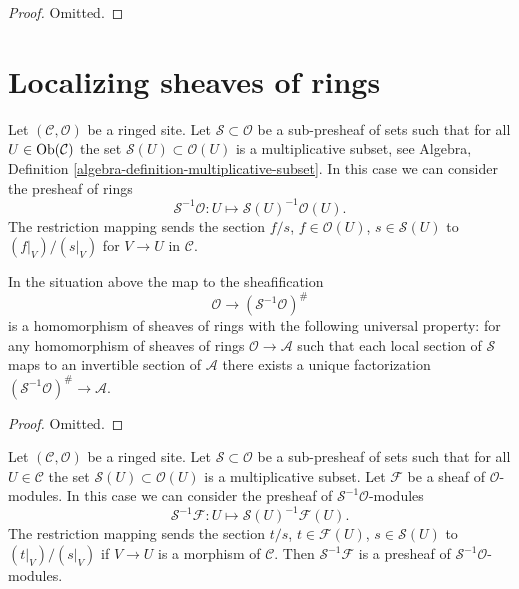 \begin{proof}
Omitted.
\end{proof}











\section{Localizing sheaves of rings}
\label{section-localizing-sheaves-rings}

\noindent
Let $(\mathcal{C}, \mathcal{O})$ be a ringed site.
Let $\mathcal{S} \subset \mathcal{O}$ be a sub-presheaf of sets
such that for all $U \in \mathop{\mathrm{Ob}}\nolimits(\mathcal{C})$ the set
$\mathcal{S}(U) \subset \mathcal{O}(U)$ is a multiplicative subset, see
Algebra, Definition \ref{algebra-definition-multiplicative-subset}.
In this case we can consider the presheaf of rings
$$
\mathcal{S}^{-1}\mathcal{O} :
U \longmapsto \mathcal{S}(U)^{-1}\mathcal{O}(U).
$$
The restriction mapping sends the section
$f/s$, $f \in \mathcal{O}(U)$, $s \in \mathcal{S}(U)$
to $(f|_V)/(s|_V)$ for $V \to U$ in $\mathcal{C}$.

\begin{lemma}
\label{lemma-simple-invert}
In the situation above the map to the sheafification
$$
\mathcal{O} \longrightarrow (\mathcal{S}^{-1}\mathcal{O})^\#
$$
is a homomorphism of sheaves of rings with the following
universal property: for any homomorphism of sheaves of rings
$\mathcal{O} \to \mathcal{A}$ such that each local section
of $\mathcal{S}$ maps to an invertible section of $\mathcal{A}$
there exists a unique factorization
$(\mathcal{S}^{-1}\mathcal{O})^\# \to \mathcal{A}$.
\end{lemma}

\begin{proof}
Omitted.
\end{proof}

\noindent
Let $(\mathcal{C}, \mathcal{O})$ be a ringed site.
Let $\mathcal{S} \subset \mathcal{O}$
be a sub-presheaf of sets such that for all $U \in \mathcal{C}$ the set
$\mathcal{S}(U) \subset \mathcal{O}(U)$ is a multiplicative subset.
Let $\mathcal{F}$ be a sheaf of $\mathcal{O}$-modules.
In this case we can consider the presheaf of
$\mathcal{S}^{-1}\mathcal{O}$-modules
$$
\mathcal{S}^{-1}\mathcal{F} :
U \longmapsto \mathcal{S}(U)^{-1}\mathcal{F}(U).
$$
The restriction mapping sends the section $t/s$, $t \in \mathcal{F}(U)$,
$s \in \mathcal{S}(U)$ to $(t|_V)/(s|_V)$ if $V \to U$ is a morphism
of $\mathcal{C}$. Then $\mathcal{S}^{-1}\mathcal{F}$ is a presheaf
of $\mathcal{S}^{-1}\mathcal{O}$-modules.

